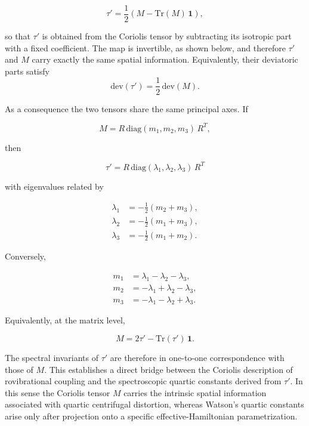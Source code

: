 \begin{equation}
\tau' =
\frac12
\left(
M - \mathrm{Tr}(M)\,\mathbf{1}
\right),
\end{equation}

so that $\tau'$ is obtained from the Coriolis tensor by subtracting its
isotropic part with a fixed coefficient.
The map is invertible, as shown below, and therefore $\tau'$ and $M$
carry exactly the same spatial information.
Equivalently, their deviatoric parts satisfy
\begin{equation}
\mathrm{dev}(\tau')=\frac12\,\mathrm{dev}(M).
\end{equation}

As a consequence the two tensors share the same principal axes.
If

\begin{equation}
M = R\,\mathrm{diag}(m_1,m_2,m_3)\,R^T,
\end{equation}

then

\begin{equation}
\tau' = R\,\mathrm{diag}(\lambda_1,\lambda_2,\lambda_3)\,R^T
\end{equation}

with eigenvalues related by

\begin{align}
\lambda_1 &= -\frac12(m_2+m_3),\\
\lambda_2 &= -\frac12(m_1+m_3),\\
\lambda_3 &= -\frac12(m_1+m_2).
\label{eq:lambda_from_m}
\end{align}

Conversely,

\begin{align}
m_1 &= \lambda_1-\lambda_2-\lambda_3,\\
m_2 &= -\lambda_1+\lambda_2-\lambda_3,\\
m_3 &= -\lambda_1-\lambda_2+\lambda_3.
\label{eq:m_from_lambda}
\end{align}

Equivalently, at the matrix level,

\begin{equation}
M = 2\tau' - \mathrm{Tr}(\tau')\,\mathbf 1.
\label{eq:M_from_tauprime_matrix}
\end{equation}

The spectral invariants of $\tau'$ are therefore in one-to-one
correspondence with those of $M$.
This establishes a direct bridge between the Coriolis description of
rovibrational coupling and the spectroscopic quartic constants derived
from $\tau'$.
In this sense the Coriolis tensor $M$ carries the intrinsic spatial
information associated with quartic centrifugal distortion, whereas
Watson's quartic constants arise only after projection onto a specific
effective-Hamiltonian parametrization.
